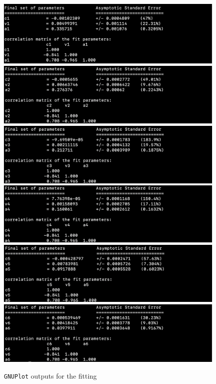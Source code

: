 \documentclass[11pt, a4paper, abstract=true]{scrartcl}
\begin{document}
\begin{figure}[H]
    \centering
    \includegraphics[scale=0.55]{assets/gnuplot_shots/1.png}
    \includegraphics[scale=0.55]{assets/gnuplot_shots/2.png}
    \includegraphics[scale=0.55]{assets/gnuplot_shots/3.png}
    \includegraphics[scale=0.55]{assets/gnuplot_shots/4.png}
    \includegraphics[scale=0.55]{assets/gnuplot_shots/5.png}
    \includegraphics[scale=0.55]{assets/gnuplot_shots/6.png}
    \caption{\texttt{GNUPlot} outputs for the fitting}
    \label{fig:fig2}
\end{figure}
\end{document}
